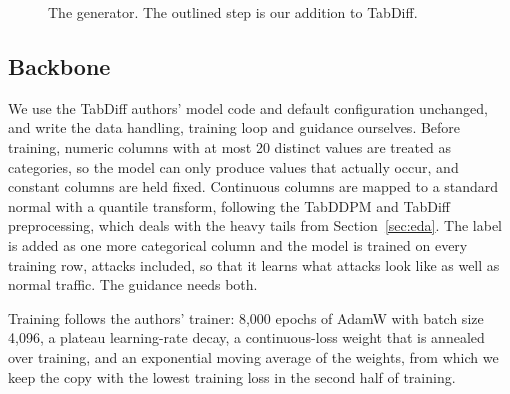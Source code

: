 \documentclass[11pt,a4paper]{article}
\begin{document}
\begin{figure}[htb]
\centering
{}
\caption{The generator. The outlined step is our addition to TabDiff.}
\label{fig:pipeline}
\end{figure}

\subsection{Backbone}

We use the TabDiff authors' model code and default configuration unchanged, and write the data handling, training loop and guidance ourselves. Before training, numeric columns with at most 20 distinct values are treated as categories, so the model can only produce values that actually occur, and constant columns are held fixed. Continuous columns are mapped to a standard normal with a quantile transform, following the TabDDPM and TabDiff preprocessing, which deals with the heavy tails from Section~\ref{sec:eda}. The label is added as one more categorical column and the model is trained on every training row, attacks included, so that it learns what attacks look like as well as normal traffic. The guidance needs both.

Training follows the authors' trainer: 8,000 epochs of AdamW with batch size 4,096, a plateau learning-rate decay, a continuous-loss weight that is annealed over training, and an exponential moving average of the weights, from which we keep the copy with the lowest training loss in the second half of training.
\end{document}
